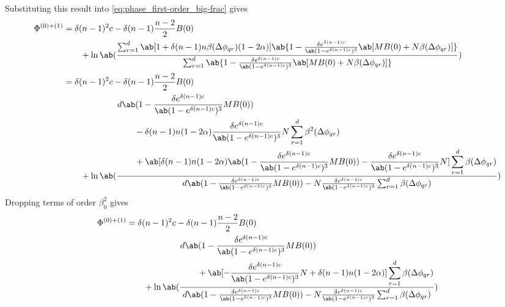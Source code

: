 Substituting this result into \cref{eq:phase_first-order_big-frac} gives
\begin{equation}
  \begin{aligned}
    \Phi^{(0)+(1)} &=
\delta(n-1)^2 c - \delta (n-1) \frac{n-2}{2} B(0) \\
  &\qquad +
\ln\ab(
\frac{\sum_{r=1}^{d}
  \ab[
  1 + \delta (n-1) n \beta(\Delta\phi_{qr}) (1 - 2 \alpha)]
  \ab\{
1 -
    \frac{\delta e^{\delta(n-1)c}}{\ab(1-e^{\delta (n-1)c})^3}
    \ab[
  M B(0) + N \beta(\Delta \phi_{qr})]
\}
                               }
{\sum_{r=1}^{d}
  \ab\{
1 -
    \frac{\delta e^{\delta(n-1)c}}{\ab(1-e^{\delta (n-1)c})^3}
    \ab[
  M B(0) + N \beta(\Delta \phi_{qr})]
\}
                  }
  )
  \\
  &=
\delta(n-1)^2 c - \delta (n-1) \frac{n-2}{2} B(0) \\
  &\qquad +
\ln\ab(
\frac{
  \begin{aligned}
&d\ab(1 -
    \frac{\delta e^{\delta(n-1)c}}{\ab(1-e^{\delta (n-1)c})^3}
  M B(0))
  \\
&\qquad-
  \delta (n-1) n (1 - 2 \alpha)
  \frac{\delta e^{\delta(n-1)c}}{\ab(1-e^{\delta (n-1)c})^3} N
  \sum_{r=1}^{d}
  \beta^2(\Delta\phi_{qr})
  \\
&\qquad+
  \ab[
  \delta (n-1) n (1 - 2 \alpha) \ab( 1 -
    \frac{\delta e^{\delta(n-1)c}}{\ab(1-e^{\delta (n-1)c})^3}
  M B(0))
  - \frac{\delta e^{\delta(n-1)c}}{\ab(1-e^{\delta (n-1)c})^3} N
  ]
  \sum_{r=1}^{d}
  \beta(\Delta \phi_{qr})
\end{aligned}
}
{d\ab(1 -
    \frac{\delta e^{\delta(n-1)c}}{\ab(1-e^{\delta (n-1)c})^3}
  M B(0))
  - N \frac{\delta e^{\delta(n-1)c}}{\ab(1-e^{\delta (n-1)c})^3}
  \sum_{r=1}^{d} \beta(\Delta \phi_{qr})
                  }
  )
\end{aligned}
\end{equation}
Dropping terms of order $\beta_0^2$ gives
\begin{equation}
  \begin{aligned}
    \Phi^{(0)+(1)} &=
\delta(n-1)^2 c - \delta (n-1) \frac{n-2}{2} B(0) \\
  &\qquad +
\ln\ab(
\frac{
  \begin{aligned}
&d\ab(1 -
    \frac{\delta e^{\delta(n-1)c}}{\ab(1-e^{\delta (n-1)c})^3}
  M B(0))
  \\
&\qquad+
  \ab[
-
    \frac{\delta e^{\delta(n-1)c}}{\ab(1-e^{\delta (n-1)c})^3} N
    +
\delta (n-1) n (1 - 2 \alpha)
]
  \sum_{r=1}^{d}
  \beta(\Delta \phi_{qr})
\end{aligned}
}
{d\ab(1 -
    \frac{\delta e^{\delta(n-1)c}}{\ab(1-e^{\delta (n-1)c})^3}
  M B(0))
  - N \frac{\delta e^{\delta(n-1)c}}{\ab(1-e^{\delta (n-1)c})^3}
  \sum_{r=1}^{d} \beta(\Delta \phi_{qr})
                  }
  )
\end{aligned}
\end{equation}

